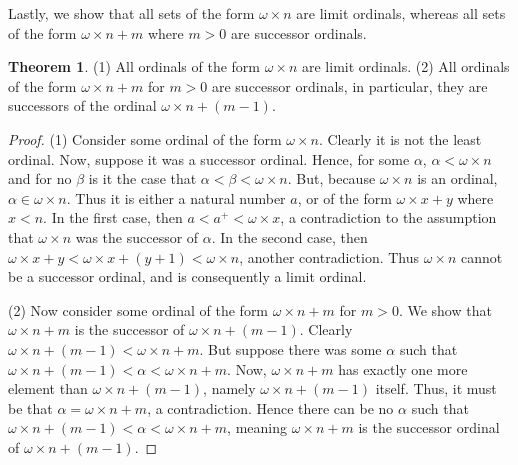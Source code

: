 \documentclass{article}
\theoremstyle{definition}
\newtheorem{theorem}{Theorem}[section]
\begin{document}
Lastly, we show that all sets of the form $\omega\times n$ are limit ordinals, whereas all sets of the form 
$\omega\times n+m$ where $m>0$ are successor ordinals.

\begin{theorem} (1) All ordinals of the form $\omega\times n$ are limit ordinals. (2) All ordinals of the form
$\omega\times n+m$ for $m>0$ are successor ordinals, in particular, they are successors of the ordinal 
$\omega\times n+(m-1)$.
\end{theorem}
\begin{proof}
(1) Consider some ordinal of the form $\omega\times n$. Clearly it is not the least ordinal. Now, suppose it was a successor ordinal. Hence, 
for some $\alpha$, $\alpha<\omega\times n$ and for no $\beta$ is it the case that $\alpha<\beta<\omega\times n$. But, because 
$\omega\times n$ is an ordinal, $\alpha\in\omega\times n$. Thus it is either a natural number $a$, or of the form 
$\omega\times x+y$ where $x<n$. In the first case, then $a<a^+<\omega\times x$, a contradiction to the assumption that 
$\omega\times n$ was the successor of $\alpha$. In the second case, then 
$\omega\times x+y<\omega\times x+(y+1)<\omega\times n$, another contradiction. Thus $\omega\times n$ cannot be a successor ordinal, 
and is consequently a limit ordinal.

(2) Now consider some ordinal of the form $\omega\times n+m$ for $m>0$. We show that 
$\omega\times n+m$ is the successor of $\omega\times n+(m-1)$. Clearly $\omega\times n+(m-1)<\omega\times n+m$. But 
suppose there was some $\alpha$ such that $\omega\times n+(m-1)<\alpha<\omega\times n+m$. Now, 
$\omega\times n+m$ has exactly one more element than $\omega\times n+(m-1)$, namely $\omega\times n+(m-1)$ itself. Thus, 
it must be that $\alpha=\omega\times n+m$, a contradiction. Hence there can be no $\alpha$ such that 
$\omega\times n+(m-1)<\alpha<\omega\times n+m$, meaning $\omega\times n+m$ is the successor ordinal of 
$\omega\times n+(m-1)$.
\end{proof}
\end{document}
